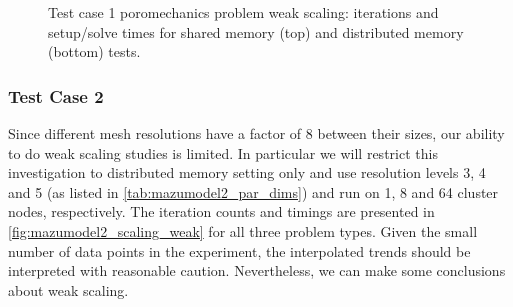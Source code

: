 \begin{figure} [htbp]
  \begin{subfigure}[t]{0.48\textwidth}
    \centering
    
  \end{subfigure}
  \hfill
  \begin{subfigure}[t]{0.48\textwidth}
    \centering
    
  \end{subfigure}
  \begin{subfigure}[t]{0.48\textwidth}
    \centering
    
  \end{subfigure}
  \hfill
  \begin{subfigure}[t]{0.48\textwidth}
    \centering
    
  \end{subfigure}
  \caption[Test case 1 poromechanics problem weak scaling]{Test case 1 poromechanics problem weak scaling: iterations and setup/solve times for shared memory (top) and distributed memory (bottom) tests.}
  \label{fig:cart_scaling_weak_poro}
\end{figure}

\subsubsection{Test Case 2}

Since different mesh resolutions have a factor of 8 between their sizes, our ability to do weak scaling studies is limited.   In particular we will restrict this investigation to distributed memory setting only and use resolution levels 3, 4 and 5 (as listed in \cref{tab:mazumodel2_par_dims}) and run on 1, 8 and 64 cluster nodes, respectively.   The iteration counts and timings are presented in \cref{fig:mazumodel2_scaling_weak} for all three problem types.   Given the small number of data points in the experiment, the interpolated trends should be interpreted with reasonable caution.   Nevertheless, we can make some conclusions about weak scaling.

